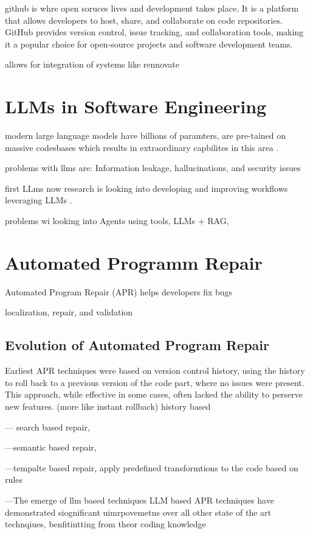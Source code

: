 github is whre open soruces lives and development takes place. It is a platform that allows developers to host, share, and collaborate on code repositories. GitHub provides version control, issue tracking, and collaboration tools, making it a popular choice for open-source projects and software development teams.

allows for integration of systems like rennovate


\section{LLMs in Software Engineering}

modern large language models have billions of paramters, are pre-tained on massive codesbases which results in extraordinary capbilites in this area  \cite{chenUnveilingPitfallsUnderstanding2025}.

problems with llms are: Information leakage, hallucinations, and security issues

first LLms now research is looking into developing and improving workflows leveraging LLMs \cite{puvvadiCodingAgentsComprehensive2025}.

problems wi
looking into Agents using tools, LLMs + RAG,

\section{Automated Programm Repair}

Automated Program Repair (APR) helps developers fix bugs

localization, repair, and validation


\subsection{Evolution of Automated Program Repair}
Earliest APR techniques were based on version control history, using the history to roll back to a previous version of the code part, where no issues were present. This approach, while effective in some cases, often lacked the ability to perserve new features. (more like instant rollback)
history based

--- search based repair,

---semantic based repair,

---tempalte based repair,
apply predefined transformtions to the code based on rules

---The emerge of llm based techniques
LLM based APR techniques have demonstrated siognificant uimrpovemetns over all other state of the art technqiues, benfitintting from theor coding knowledge \cite{hossainDeepDiveLarge2024}

